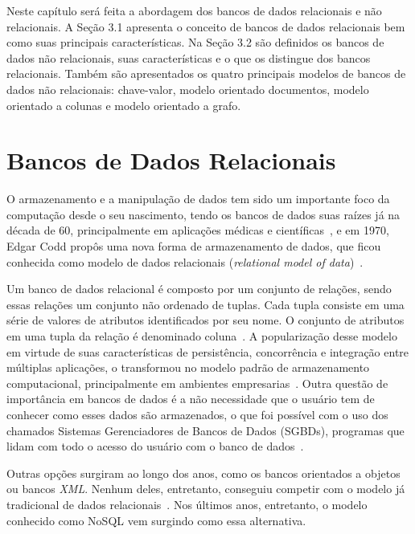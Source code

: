 Neste capítulo será feita a abordagem dos bancos de dados relacionais e não relacionais. A Seção 3.1 apresenta o conceito de bancos de dados relacionais bem como suas principais características. Na Seção 3.2 são definidos os bancos de dados não relacionais, suas características e o que os distingue dos bancos relacionais. Também são apresentados os quatro principais modelos de bancos de dados não relacionais: chave-valor, modelo orientado documentos, modelo orientado a colunas e modelo orientado a grafo.

\section{Bancos de Dados Relacionais}
O armazenamento e a manipulação de dados tem sido um importante foco da computação desde o seu nascimento, tendo os bancos de dados suas raízes já na década de 60, principalmente em aplicações médicas e científicas~\cite{neufeld1986database}, e em 1970, Edgar Codd propôs uma nova forma de armazenamento de dados, que ficou conhecida como modelo de dados relacionais (\emph{relational model of data})~\cite{codd1970relational}. 

Um banco de dados relacional é composto por um conjunto de relações, sendo essas relações um conjunto não ordenado de tuplas. Cada tupla consiste em uma série de valores de atributos identificados por seu nome. O conjunto de atributos em uma tupla da relação é denominado coluna~\cite{heuser}. A popularização desse modelo em virtude de suas características de persistência, concorrência e integração entre múltiplas aplicações, o transformou no modelo padrão de armazenamento computacional, principalmente em ambientes empresarias~\cite{pramod}. Outra questão de importância em bancos de dados é a não necessidade que o usuário tem de conhecer como esses dados são armazenados, o que foi possível com o uso dos chamados Sistemas Gerenciadores de Bancos de Dados (SGBDs), programas que lidam com todo o acesso do usuário com o banco de dados~\cite{jan, cjdate}.

Outras opções surgiram ao longo dos anos, como os bancos orientados a objetos ou bancos \emph{XML}. Nenhum deles, entretanto, conseguiu competir com o modelo já tradicional de dados relacionais~\cite{pramod}. Nos últimos anos, entretanto, o modelo conhecido como NoSQL vem surgindo como essa alternativa.


